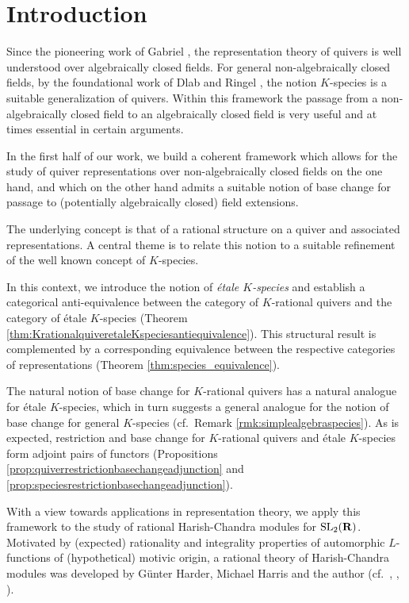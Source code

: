 \documentclass[a4paper,12pt,reqno]{amsart}
\newcommand{\RR}{{\rm\bf R}}
\DeclareMathOperator{\SL}{\mathrm{SL}}
\theoremstyle{plain}
\theoremstyle{remark}
\begin{document}
    \section*{Introduction}

    Since the pioneering work of Gabriel \cite{Gabriel1972}, the representation theory of quivers is well understood over algebraically closed fields. For general non-algebraically closed fields, by the foundational work of Dlab and Ringel \cite{DlabRingel1975,DlabRingel1976}, the notion $K$-species is a suitable generalization of quivers. Within this framework the passage from a non-algebraically closed field to an algebraically closed field is very useful and at times essential in certain arguments.

    In the first half of our work, we build a coherent framework which allows for the study of quiver representations over non-algebraically closed fields on the one hand, and which on the other hand admits a suitable notion of base change for passage to (potentially algebraically closed) field extensions.

    The underlying concept is that of a rational structure on a quiver and associated representations. A central theme is to relate this notion to a suitable refinement of the well known concept of $K$-species.

    In this context, we introduce the notion of {\em \'etale $K$-species} and establish a categorical anti-equivalence between the category of $K$-rational quivers and the category of \'etale $K$-species (Theorem \ref{thm:KrationalquiveretaleKspeciesantiequivalence}). This structural result is complemented by a corresponding equivalence between the respective categories of representations (Theorem \ref{thm:species_equivalence}).

    The natural notion of base change for $K$-rational quivers has a natural analogue for \'etale $K$-species, which in turn suggests a general analogue for the notion of base change for general $K$-species (cf.\ Remark \ref{rmk:simplealgebraspecies}). As is expected, restriction and base change for $K$-rational quivers and \'etale $K$-species form adjoint pairs of functors (Propositions \ref{prop:quiverrestrictionbasechangeadjunction} and \ref{prop:speciesrestrictionbasechangeadjunction}).

    \smallskip
    With a view towards applications in representation theory, we apply this framework to the study of rational Harish-Chandra modules for $\SL_2(\RR)$. Motivated by (expected) rationality and integrality properties of automorphic $L$-functions of (hypothetical) motivic origin, a rational theory of Harish-Chandra modules was developed by G\"unter Harder, Michael Harris and the author (cf.\ \cite{HarderRaghuram-Book}, \cite{Harris2012,Harris2020Erratum}, \cite{Januszewski18}).
\end{document}

